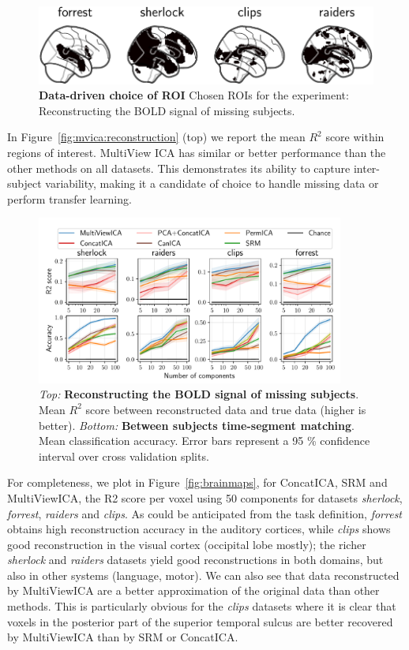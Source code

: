 \begin{figure}
  \centering
  \includegraphics[width=\textwidth]{figures/mvica/reconstruction_score_roi.pdf}
  \caption{\textbf{Data-driven choice of ROI} Chosen ROIs for the experiment: Reconstructing the BOLD signal of missing subjects.}
  \label{fig:roi}
\end{figure}

In Figure~\ref{fig:mvica:reconstruction}
(top) we report the mean $R^2$ score within regions of interest.
%
MultiView ICA has similar or better performance than the other methods on all datasets.
%
This demonstrates its ability to capture inter-subject variability, making it a candidate of choice to handle missing data or perform transfer learning.

\begin{figure}
  \centering
  \includegraphics[width=0.9\textwidth]{figures/mvica/timesegment_matching_reconstruction.pdf}
  \caption{\emph{Top:} \textbf{Reconstructing the BOLD signal of
      missing subjects}. Mean $R^2$ score between reconstructed data and true
    data (higher is better). \emph{Bottom:} \textbf{Between subjects time-segment matching}. Mean
    classification accuracy. Error bars represent a 95 \% confidence interval over cross validation splits.}
  \label{fig:mvica:reconstruction}
  \label{fig:mvica:timesegment}
\end{figure}


For completeness, we plot in Figure~\ref{fig:brainmaps}, for ConcatICA, SRM and MultiViewICA, the R2 score per voxel using 50 components for datasets \emph{sherlock}, \emph{forrest}, \emph{raiders} and \emph{clips}. As could be anticipated from the task definition, \emph{forrest} obtains high reconstruction accuracy in the auditory cortices, while \emph{clips} shows good reconstruction in the visual cortex (occipital lobe mostly); the richer \emph{sherlock} and \emph{raiders} datasets yield good reconstructions in both domains, but also in other systems (language, motor).
%
We can also see that data reconstructed by MultiViewICA are
a better approximation of the original data than other methods.
%
This is particularly obvious for the \emph{clips} datasets where it is
clear that voxels in the posterior part of the superior
temporal sulcus are better recovered by MultiViewICA than by SRM or
ConcatICA.

